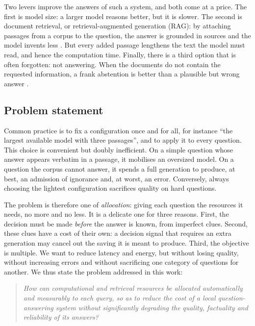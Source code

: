 \documentclass[11pt,a4paper]{article}
\begin{document}
Two levers improve the answers of such a system, and both come at a price. The first is model size: a
larger model reasons better, but it is slower. The second is document retrieval, or retrieval-augmented
generation (RAG): by attaching passages from a corpus to the question, the answer is grounded in sources
and the model invents less \citep{gao2023ragsurvey}. But every added passage lengthens the text the
model must read, and hence the computation time. Finally, there is a third option that is often
forgotten: not answering. When the documents do not contain the requested information, a frank
abstention is better than a plausible but wrong answer \citep{wen2024abstention}.

\subsection{Problem statement}

Common practice is to fix a configuration once and for all, for instance ``the largest available model
with three passages'', and to apply it to every question. This choice is convenient but doubly
inefficient. On a simple question whose answer appears verbatim in a passage, it mobilises an oversized
model. On a question the corpus cannot answer, it spends a full generation to produce, at best, an
admission of ignorance and, at worst, an error. Conversely, always choosing the lightest configuration
sacrifices quality on hard questions.

The problem is therefore one of \emph{allocation}: giving each question the resources it needs, no more
and no less. It is a delicate one for three reasons. First, the decision must be made \emph{before} the
answer is known, from imperfect clues. Second, these clues have a cost of their own: a decision signal
that requires an extra generation may cancel out the saving it is meant to produce. Third, the objective
is multiple. We want to reduce latency and energy, but without losing quality, without increasing
errors and without sacrificing one category of questions for another. We thus state the problem
addressed in this work:

\begin{quote}
\emph{How can computational and retrieval resources be allocated automatically and measurably to each
query, so as to reduce the cost of a local question-answering system without significantly degrading
the quality, factuality and reliability of its answers?}
\end{quote}
\end{document}
